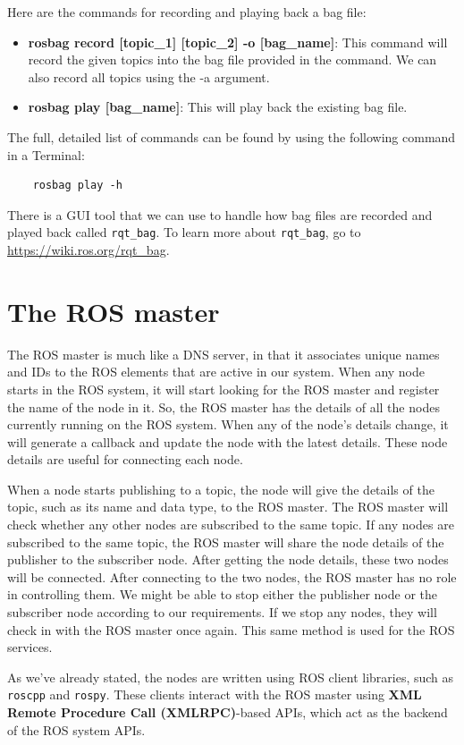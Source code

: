 \documentclass[../../main]{subfiles}
\begin{document}
Here are the commands for recording and playing back a bag file:
\begin{itemize}
    \item \textbf{rosbag record [topic\_1] [topic\_2] -o [bag\_name]}: This command will record the given topics into the bag file provided in the command. We can also record all topics using the -a argument.
    \item \textbf{rosbag play [bag\_name]}: This will play back the existing bag file.
\end{itemize}
The full, detailed list of commands can be found by using the following command in a
Terminal:
\begin{verbatim}
    rosbag play -h
\end{verbatim}
There is a GUI tool that we can use to handle how bag files are recorded and played back called \texttt{rqt\_bag}. To learn more about \texttt{rqt\_bag}, go to \url{https://wiki.ros.org/rqt_bag}.
\newpage
\section{The ROS master}
The ROS master is much like a DNS server, in that it associates unique names and IDs to the ROS elements that are active in our system. When any node starts in the ROS system, it will start looking for the ROS master and register the name of the node in it. So, the ROS master has the details of all the nodes currently running on the ROS system. When any of the node's details change, it will generate a callback and update the node with the latest details. These node details are useful for connecting each node.

When a node starts publishing to a topic, the node will give the details of the topic, such as its name and data type, to the ROS master. The ROS master will check whether any other nodes are subscribed to the same topic. If any nodes are subscribed to the same topic, the ROS master will share the node details of the publisher to the subscriber node. After getting the node details, these two nodes will be connected. After connecting to the two nodes, the ROS master has no role in controlling them. We might be able to stop either the publisher node or the subscriber node according to our requirements. If we stop any nodes, they will check in with the ROS master once again. This same method is used for the ROS services.

As we've already stated, the nodes are written using ROS client libraries, such as \texttt{roscpp} and \texttt{rospy}. These clients interact with the ROS master using \textbf{XML Remote Procedure Call (XMLRPC)}-based APIs, which act as the backend of the ROS system APIs.
\end{document}
